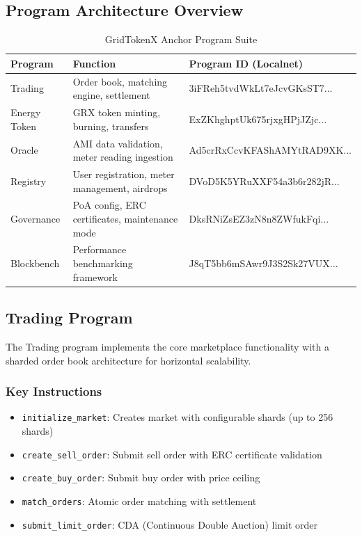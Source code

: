 \documentclass[conference]{IEEEtran}
\begin{document}
{\subsection{Program Architecture Overview}

\begin{table}[htbp]
\caption{GridTokenX Anchor Program Suite}
\begin{center}
\begin{tabular}{lp{6cm}p{4cm}}
\toprule
\textbf{Program} & \textbf{Function} & \textbf{Program ID (Localnet)} \\
\midrule
Trading & Order book, matching engine, settlement & 3iFReh5tvdWkLt7eJcvGKsST7... \\
Energy Token & GRX token minting, burning, transfers & ExZKhghptUk675rjxgHPjJZjc... \\
Oracle & AMI data validation, meter reading ingestion & Ad5crRxCcvKFAShAMYtRAD9XK... \\
Registry & User registration, meter management, airdrops & DVoD5K5YRuXXF54a3b6r282jR... \\
Governance & PoA config, ERC certificates, maintenance mode & DksRNiZsEZ3zN8n8ZWfukFqi... \\
Blockbench & Performance benchmarking framework & J8qT5bb6mSAwr9J3S2Sk27VUX... \\
\bottomrule
\end{tabular}
\label{tab:anchor-programs}
\end{center}
\end{table}

\subsection{Trading Program}

The Trading program implements the core marketplace functionality with a sharded order book architecture for horizontal scalability.

\subsubsection{Key Instructions}

\begin{itemize}
    \item \texttt{initialize\_market}: Creates market with configurable shards (up to 256 shards)
    \item \texttt{create\_sell\_order}: Submit sell order with ERC certificate validation
    \item \texttt{create\_buy\_order}: Submit buy order with price ceiling
    \item \texttt{match\_orders}: Atomic order matching with settlement
    \item \texttt{submit\_limit\_order}: CDA (Continuous Double Auction) limit order
\end{itemize}

}
\end{document}

